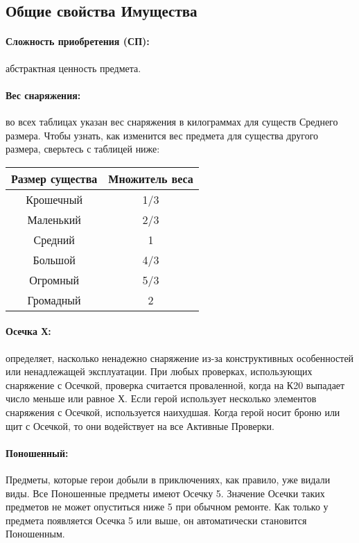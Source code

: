 \subsection{Общие свойства Имущества}
\paragraph{Сложность приобретения (СП):} абстрактная ценность предмета.
\paragraph{Вес снаряжения:} во всех таблицах указан вес снаряжения в килограммах для существ Среднего размера. Чтобы узнать, как изменится вес предмета для существа другого размера, сверьтесь с таблицей ниже:
\begin{center}\begin{tabular}{ |c|c| }\hline
    \textbf{Размер существа} & \textbf{Множитель веса} \\ \hline
    Крошечный & 1/3 \\ \hline
    Маленький & 2/3 \\ \hline
    Средний & 1 \\ \hline
    Большой & 4/3 \\ \hline
    Огромный & 5/3 \\ \hline
    Громадный & 2 \\ \hline
\end{tabular}\end{center}

\paragraph{Осечка Х:} определяет, насколько ненадежно снаряжение из-за конструктивных особенностей или ненадлежащей эксплуатации. При любых проверках, использующих снаряжение с Осечкой, проверка считается проваленной, когда на К20 выпадает число меньше или равное Х. 
\newline Если герой использует несколько элементов снаряжения с Осечкой, используется наихудшая. Когда герой носит броню или щит с Осечкой, то они водействует на все Активные Проверки.
\paragraph{Поношенный:} Предметы, которые герои добыли в приключениях, как правило, уже видали виды. Все Поношенные предметы имеют Осечку 5. Значение Осечки таких предметов не может опуститься ниже 5 при обычном ремонте.
\newline Как только у предмета появляется Осечка 5 или выше, он автоматически становится Поношенным.
